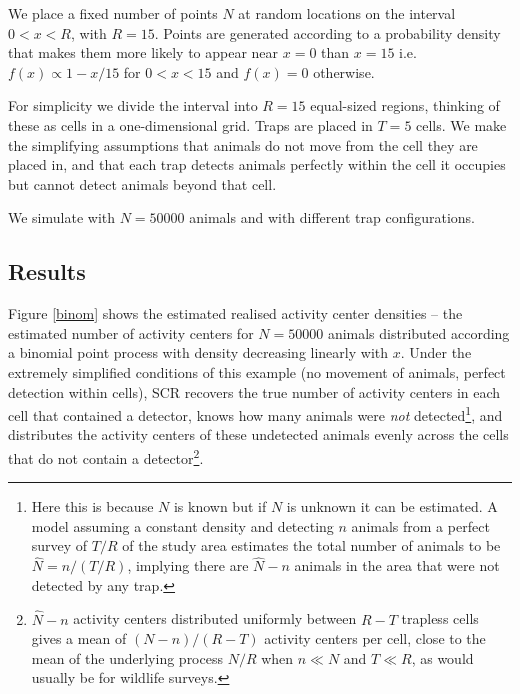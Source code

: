 \documentclass[a4paper,12pt]{article}
\begin{document}
We place a fixed number of points $N$ at random locations on the interval $0<x<R$, with $R=15$. Points are generated according to a probability density that makes them more likely to appear near $x=0$ than $x=15$ i.e.\ $f(x)\propto 1-x/15$ for $0<x<15$ and $f(x)=0$ otherwise.

For simplicity we divide the interval into $R=15$ equal-sized regions, thinking of these as cells in a one-dimensional grid. Traps are placed in $T=5$ cells. We make the simplifying assumptions that animals do not move from the cell they are placed in, and that each trap detects animals perfectly within the cell it occupies but cannot detect animals beyond that cell. 

We simulate with $N=50000$ animals and with different trap configurations.

\subsection{Results}
Figure \ref{binom} shows the estimated realised activity center densities -- the estimated number of activity centers for $N=50000$ animals distributed according a binomial point process with density decreasing linearly with $x$. Under the extremely simplified conditions of this example (no movement of animals, perfect detection within cells), SCR recovers the true number of activity centers in each cell that contained a detector, knows how many animals were {\it not} detected\footnote{Here this is because $N$ is known but if $N$ is unknown it can be estimated. A model assuming a constant density and detecting $n$ animals from a perfect survey of $T/R$ of the study area estimates the total number of animals to be $\hat{N}=n/(T/R)$, implying there are $\hat{N}-n$ animals in the area that were not detected by any trap.}, and distributes the activity centers of these undetected animals evenly across the cells that do not contain a detector\footnote{$\hat{N}-n$ activity centers distributed uniformly between $R-T$ trapless cells gives a mean of $(N-n)/(R-T)$ activity centers per cell, close to the mean of the underlying process $N/R$ when $n\ll N$ and $T\ll R$, as would usually be for wildlife surveys.}. 
\end{document}
